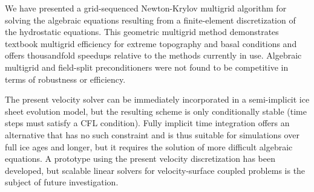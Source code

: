 We have presented a grid-sequenced Newton-Krylov multigrid algorithm for solving the algebraic equations resulting from a finite-element discretization of the hydrostatic equations.
This geometric multigrid method demonstrates textbook multigrid efficiency for extreme topography and basal conditions and offers thousandfold speedups relative to the methods currently in use.
Algebraic multigrid and field-split preconditioners were not found to be competitive in terms of robustness or efficiency.

The present velocity solver can be immediately incorporated in a semi-implicit ice sheet evolution model, but the resulting scheme is only conditionally stable (time steps must satisfy a CFL condition).
Fully implicit time integration offers an alternative that has no such constraint and is thus suitable for simulations over full ice ages and longer, but it requires the solution of more difficult algebraic equations.
A prototype using the present velocity discretization has been developed, but scalable linear solvers for velocity-surface coupled problems is the subject of future investigation.

